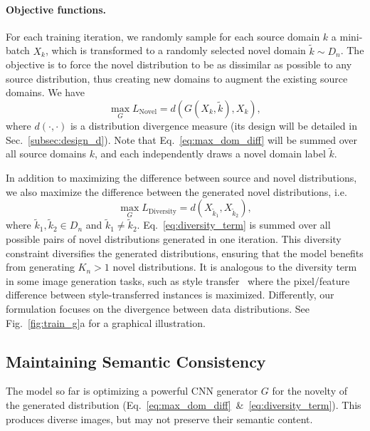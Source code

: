 \documentclass[runningheads]{llncs}
\begin{document}
\paragraph{Objective functions.}
For each training iteration, we randomly sample for each source domain $k$ a mini-batch $X_k$, which is transformed to a randomly selected novel domain $\tilde{k} \sim D_n$. The objective is to force the novel distribution to be as dissimilar as possible to any source distribution, thus creating new domains to augment the existing source domains. We have
\begin{equation} \label{eq:max_dom_diff}
\max_G L_{\mathrm{Novel}} = d(G(X_k, \tilde{k}), X_k),
\end{equation}
where $d(\cdot, \cdot)$ is a distribution divergence measure (its design will be detailed in Sec.~\ref{subsec:design_d}). Note that Eq.~\eqref{eq:max_dom_diff} will be summed over all source domains $k$, and each independently draws a novel domain label $\tilde{k}$.

In addition to maximizing the difference between source and novel distributions, we also maximize the difference between the generated novel distributions, i.e.
\begin{equation} \label{eq:diversity_term}
\max_G L_{\mathrm{Diversity}} = d(X_{\tilde{k}_1}, X_{\tilde{k}_2}),
\end{equation}
where $\tilde{k}_1, \tilde{k}_2 \in D_n$ and $\tilde{k}_1 \neq \tilde{k}_2$. Eq.~\eqref{eq:diversity_term} is summed over all possible pairs of novel distributions generated in one iteration. This diversity constraint diversifies the generated distributions, ensuring that the model benefits from generating $K_n>1$ novel distributions. It is analogous to the diversity term in some image generation tasks, such as style transfer~\cite{li2017diversified} where the pixel/feature difference between style-transferred instances is maximized. Differently, our formulation focuses on the divergence between data distributions. See Fig.~\ref{fig:train_g}a for a graphical illustration.

\subsection{Maintaining Semantic Consistency} \label{subsec:maintain_semantic}
The model so far is optimizing a powerful CNN generator $G$ for the novelty of the generated distribution (Eq.~\eqref{eq:max_dom_diff}~\&~\eqref{eq:diversity_term}). This produces diverse images, but may not preserve their semantic content.
\end{document}
